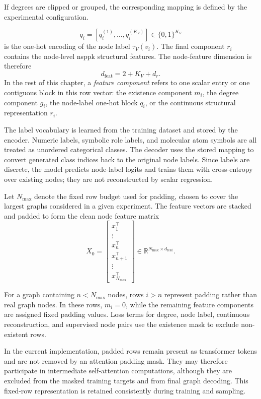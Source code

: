 If degrees are clipped or grouped, the corresponding mapping is
defined by the experimental configuration.

\[
    q_i
    =
    \left[
        q_i^{(1)},\ldots,q_i^{(K_V)}
    \right]
    \in
    \{0,1\}^{K_V}
\]
is the one-hot encoding of the node label \(\tau_V(v_i)\). The final component
\(r_i\) contains the node-level \gls{nsppk} structural features. The
node-feature dimension is therefore
\[
    d_{\mathrm{feat}} = 2 + K_V + d_r.
\]
In the rest of this chapter, a \emph{feature component} refers to one scalar
entry or one contiguous block in this row vector: the existence component
\(m_i\), the degree component \(g_i\), the node-label one-hot block \(q_i\), or
the continuous structural representation \(r_i\).

The label vocabulary is learned from the training dataset and stored by the
encoder. Numeric labels, symbolic role labels, and molecular atom symbols are
all treated as unordered categorical classes. The decoder uses the stored
mapping to convert generated class indices back to the original node labels.
Since labels are discrete, the model predicts node-label logits and trains them
with cross-entropy over existing nodes; they are not reconstructed by scalar
regression.

Let \(N_{\max}\) denote the fixed row budget used for padding, chosen to cover
the largest graphs considered in a given experiment. The feature vectors are
stacked and padded to form the clean node feature matrix
\[
X_0
=
\begin{bmatrix}
x_1^\top\\
\vdots\\
x_n^\top\\
x_{n+1}^\top\\
\vdots\\
x_{N_{\max}}^\top
\end{bmatrix}
\in
\mathbb{R}^{N_{\max}\times d_{\mathrm{feat}}}.
\]


For a graph containing $n<N_{\max}$ nodes, rows $i>n$ represent padding rather
than real graph nodes. In these rows, $m_i=0$, while the remaining feature
components are assigned fixed padding values. Loss terms for degree, node
label, continuous reconstruction, and supervised node pairs use the existence
mask to exclude non-existent rows.

In the current implementation, padded rows remain present as transformer
tokens and are not removed by an attention padding mask. They may therefore
participate in intermediate self-attention computations, although they are
excluded from the masked training targets and from final graph decoding. This
fixed-row representation is retained consistently during training and
sampling.


